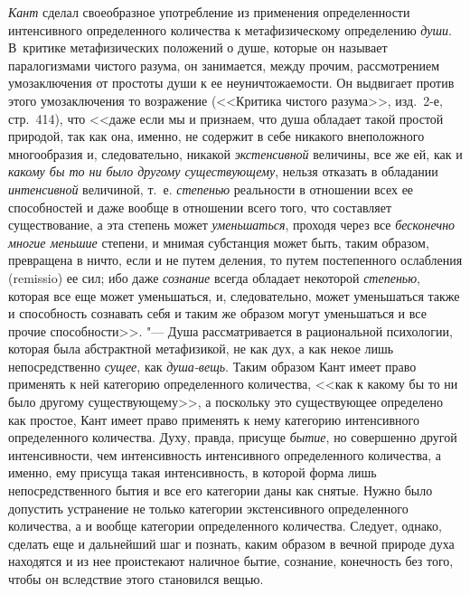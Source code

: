 {\em Кант} сделал своеобразное употребление из
применения определенности интенсивного определенного количества к
метафизическому определению {\em души}. В~критике
метафизических положений о душе, которые он называет паралогизмами чистого
разума, он занимается, между прочим, рассмотрением умозаключения от
простоты души к ее неуничтожаемости. Он выдвигает против этого
умозаключения то возражение (<<Критика чистого разума>>, изд.~2-е, стр.~414),
что <<даже если мы и признаем, что душа обладает такой простой природой, так
как она, именно, не содержит в себе никакого внеположного многообразия и,
следовательно, никакой {\em экстенсивной} величины, все
же ей, как и {\em какому бы то ни было другому
существующему}, нельзя отказать в обладании
{\em интенсивной} величиной, т.~е.
{\em степенью} реальности в отношении всех ее
способностей и даже вообще в отношении всего того, что составляет
существование, а эта степень может {\em уменьшаться},
проходя через все {\em бесконечно многие меньшие}
степени, и мнимая субстанция может быть, таким образом, превращена в ничто,
если и не путем деления, то путем постепенного ослабления (remissio) ее
сил; ибо даже {\em сознание} всегда обладает некоторой
{\em степенью}, которая все еще может уменьшаться, и,
следовательно, может уменьшаться также и способность сознавать себя и таким
же образом могут уменьшаться и все прочие способности>>. "--- Душа
рассматривается в рациональной психологии, которая была абстрактной
метафизикой, не как дух, а как некое лишь непосредственно
{\em сущее}, как {\em душа-вещь}.
Таким образом Кант имеет право применять к ней категорию определенного
количества, <<как к какому бы то ни было другому существующему>>, а поскольку
это существующее определено как простое, Кант имеет право применять к нему
категорию интенсивного определенного количества. Духу, правда, присуще
{\em бытие}, но совершенно другой интенсивности, чем
интенсивность интенсивного определенного количества, а именно, ему присуща
такая интенсивность, в которой форма лишь непосредственного бытия и все его
категории даны как снятые. Нужно было допустить устранение не только
категории экстенсивного определенного количества, а и вообще категории
определенного количества. Следует, однако, сделать еще и дальнейший шаг и
познать, каким образом в вечной природе духа находятся и из нее проистекают
наличное бытие, сознание, конечность без того, чтобы он вследствие этого
становился вещью.

